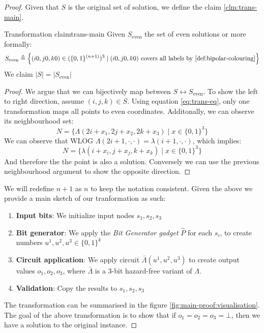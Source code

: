\begin{proof}
Given that $S$ is the original set of solution, we define the claim \ref{clm:trans-main}.

\begin{claimbox}{Transformation claim}{trans-main}
    \label{clm:main-proof:trans-claim}
    Given $S_{\text{even}}$ the set of even solutions or more formally:
    $$
        S_{\text{even}} \triangleq
        \Big\{(i0,j0,k0) \in (\{0,1\}^{(n+1)})^3 \mid (i0,j0,k0) \text{ covers all labels by \ref{def:bipolar-colouring}} \Big\}
    $$
    We claim $|S| = |S_{\text{even}}|$
\end{claimbox}

\begin{proof}
    We argue that we can bijectively map between $S \leftrightarrow S_{\text{even}}$.
    To show the left to right direction, assume $(i,j,k) \in S$.
    Using equation \ref{eq:trans-eq}, only one transformation maps all points to even coordinates.
    Additonally, we can observe its neighbourhood set:
    $$
    N = \Big\{\Lambda(2i + x_1, 2j + x_2, 2k + x_3) \mid x \in \{0,1\}^3 \Big\}
    $$
    We can observe that WLOG $\Lambda(2i + 1, \cdot, \cdot) = \lambda(i + 1, \cdot, \cdot)$, which implies:
    $$
    N = \Big\{\lambda(i + x_i, j + x_j, k + x_k) \mid x \in \{0,1\}^3 \Big\}
    $$
    And therefore the the point is also a solution. Conversely we can use the previous neighbourhood argument to show the opposite
    direction.
\end{proof}
We will redefine $n + 1$ as $n$ to keep the notation consistent.
Given the above we provide a main sketch of our tranformation as such:
\begin{enumerate}
    \item \textbf{Input bits}: We initialize input nodes $s_1, s_2, s_3$
    \item \textbf{Bit generator}: We apply the \textit{Bit Generator gadget} $\hat{P}$ for each $s_i$,
        to create numbers $u^1, u^2, u^3 \in \{0,1\}^{k}$
    \item \textbf{Circuit application}: We apply circuit $\bar{\Lambda}(u^1, u^2, u^3)$ to create output values $o_1, o_2, o_3$, where 
$\bar{\Lambda}$ is a 3-bit hazard-free variant of $\Lambda$.
    \item \textbf{Validation}: Copy the results to $s_1, s_2, s_3$
\end{enumerate}
The transformation can be summarised in the figure \ref{fig:main-proof:visualisation}.
The goal of the above transformation is to show that if $o_1 = o_2 =o_3 = \bot$, then we have a solution
to the original instance.


\end{proof}
